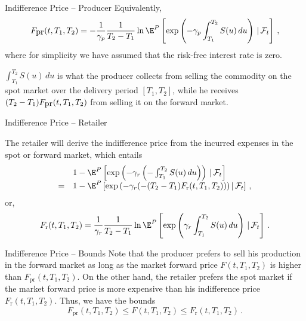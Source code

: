 {Indifference Price -- Producer}
Equivalently,
\begin{equation}
\label{def-producer}
F_{\hbox{pr}}(t,T_1,T_2)=-\frac1{\gamma_p}\frac1{T_2-T_1}\ln\E^P
\left[\exp\left(-\gamma_p\int_{T_1}^{T_2}S(u)\,du\right)\,|\,
\mathcal{F}_t\right]\,,
\end{equation}
where for simplicity we have assumed that the risk-free interest
rate is zero.

$\int_{T_1}^{T_2}S(u)\,du$ is what the
producer collects from selling the commodity on the spot market
over the delivery period $[T_1,T_2]$, while he receives
$(T_2-T_1)F_{\hbox{pr}}(t,T_1,T_2)$ from selling it on the forward
market.



{Indifference Price -- Retailer}

The retailer will derive the indifference price from the incurred expenses
in the spot or forward market, which entails
$$
\begin{array}{ll}
&1-\E^P\left[\exp\left(-\gamma_r\left(-\int_{T_1}^{T_2}S(u)\,du\right)\right)
\,|\,\mathcal{F}_t\right]\\
= &1-\E^P\left[\exp\left(-\gamma_r(-(T_2-T_1)F_{\text{r}}(t,T_1,T_2)\right))\,|\,
\mathcal{F}_t\right]\,,
\end{array}
$$
or,
\begin{equation}
F_{\text{r}}(t,T_1,T_2)=\frac1{\gamma_r}\frac1{T_2-T_1}\ln\E^P\left[
\exp\left(\gamma_r\int_{T_1}^{T_2}S(u)\,du\right)\,|\,\mathcal{F}_t\right]\,.
\end{equation}





{Indifference Price -- Bounds}
Note that the producer prefers to sell his production in the forward
market as long as the market forward price $F(t,T_1,T_2)$ is higher
than $F_{\text{pr}}(t,T_1,T_2)$. On the other hand, the retailer
prefers the spot market if the market forward price is more
expensive than his indifference price $F_{\text{r}}(t,T_1,T_2)$.
Thus, we have the bounds
\begin{equation}\label{bounds for forward}
F_{\text{pr}}(t,T_1,T_2)\leq F(t,T_1,T_2)\leq
F_{\text{r}}(t,T_1,T_2)\,.
\end{equation}



